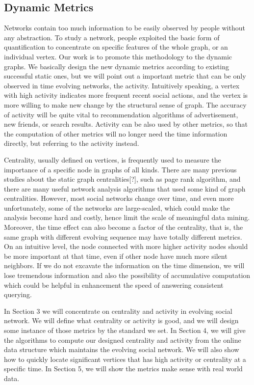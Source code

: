 \documentclass[12pt,abstract=true]{scrartcl}
\numberwithin{equation}{section}
\theoremstyle{definition}   \newtheorem{definition}{Definition}[section]
\theoremstyle{plain}        \newtheorem{theorem}{Theorem}[section]
\theoremstyle{plain}        \newtheorem{observation}{Observation}[section]
\theoremstyle{plain}        \newtheorem{fact}{Fact}[section]
\theoremstyle{plain}        \newtheorem{claim}{Claim}[section]
\theoremstyle{plain}        \newtheorem{lemma}[theorem]{Lemma}
\theoremstyle{plain}        \newtheorem{corollary}[theorem]{Corollary}
\theoremstyle{remark}       \newtheorem{example}{Example}[section]
\theoremstyle{remark}       \newtheorem{remark}{Remark}[section]
\begin{document}
\subsection{Dynamic Metrics}
Networks contain too much information to be easily observed by people without
any abstraction. To study a network, people exploited the basic form of
quantification to concentrate on specific features of the whole graph, or an
individual vertex. Our work is to promote this methodology to the dynamic
graphs. We basically design the new dynamic metrics according to existing
successful static ones, but we will point out a important metric that can be
only observed in time evolving networks, the activity. Intuitively speaking,
a vertex with high activity indicates more frequent recent social actions, and
the vertex is more willing to make new change by the structural sense of graph.
The accuracy of activity will be quite vital to recommendation algorithms of
advertisement, new friends, or search results. Activity can be also used by
other metrics, so that the computation of other metrics will no longer need the
time information directly, but referring to the activity instead.

Centrality, usually defined on vertices, is frequently used to measure the
importance of a specific node in graphs of all kinds. There are many previous
studies about the static graph centralities[?], such as page rank
algorithm\cite{page1999pagerank}, and there are many useful
network analysis algorithms that used some kind of graph centralities. However,
most social networks change over time, and even more unfortunately, some of the
networks are large-scaled, which could make the analysis become hard and
costly, hence limit the scale of meaningful data mining. Moreover, the time
effect can also become a factor of the centrality, that is, the same graph with
different evolving sequence may have totally different metrics. On an
intuitive level, the node connected with more higher activity nodes should be
more important at that time, even if other node have much more silent
neighbors. If we do not excavate the information on the time dimension, we will
lose tremendous information and also the possibility of accumulative
computation which could be helpful in enhancement the speed of answering
consistent querying.

In Section 3 we will concentrate on centrality and activity in evolving social
network. We will define what centrality or activity is good, and we will design
some instance of those metrics by the standard we set. In Section 4, we will
give the algorithms to compute our designed centrality and activity from the
online data structure which maintains the evolving social network. We will also
show how to quickly locate significant vertices that has high activity or
centrality at a specific time. In Section 5, we will show the metrics make
sense with real world data.
\end{document}
